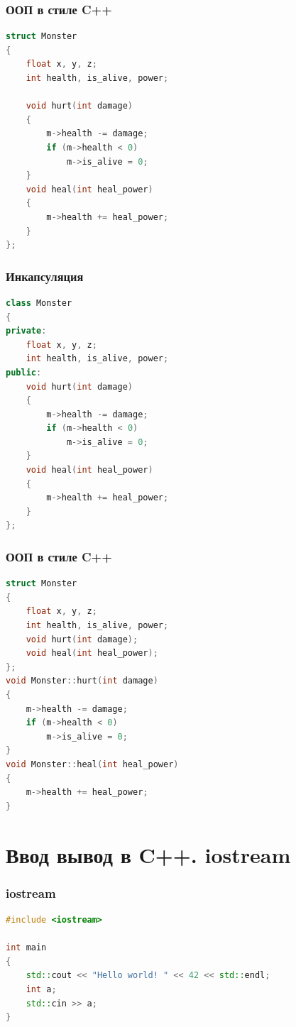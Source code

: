 \documentclass[10pt]{beamer}
\begin{document}
\begin{frame}[fragile]
\frametitle{ООП в стиле C++} 
\begin{lstlisting}[language=C++,basicstyle=\ttfamily,keywordstyle=\color{blue}]
struct Monster
{
    float x, y, z;
    int health, is_alive, power;
    
    void hurt(int damage)
    {
        m->health -= damage;
        if (m->health < 0)
            m->is_alive = 0;
    }
    void heal(int heal_power)
    {
        m->health += heal_power;
    }
};
\end{lstlisting}
\end{frame}

\begin{frame}[fragile]
\frametitle{Инкапсуляция} 
\begin{lstlisting}[language=C++,basicstyle=\ttfamily,keywordstyle=\color{blue}]
class Monster
{
private:
    float x, y, z;
    int health, is_alive, power;
public:
    void hurt(int damage)
    {
        m->health -= damage;
        if (m->health < 0)
            m->is_alive = 0;
    }
    void heal(int heal_power)
    {
        m->health += heal_power;
    }
};
\end{lstlisting}
\end{frame}


\begin{frame}[fragile]
\frametitle{ООП в стиле C++} 
\begin{lstlisting}[language=C++,basicstyle=\ttfamily,keywordstyle=\color{blue}]
struct Monster
{
    float x, y, z;
    int health, is_alive, power;
    void hurt(int damage);
    void heal(int heal_power);
};
void Monster::hurt(int damage)
{
    m->health -= damage;
    if (m->health < 0)
        m->is_alive = 0;
}
void Monster::heal(int heal_power)
{
    m->health += heal_power;
}
\end{lstlisting}
\end{frame}

\section{Ввод вывод в C++. iostream}

\begin{frame}[fragile]
\frametitle{iostream} 
\begin{lstlisting}[language=C++,basicstyle=\ttfamily,keywordstyle=\color{blue}]
#include <iostream>

int main 
{
    std::cout << "Hello world! " << 42 << std::endl;    
    int a;
    std::cin >> a;
}
\end{lstlisting}
\end{frame}
\end{document}

